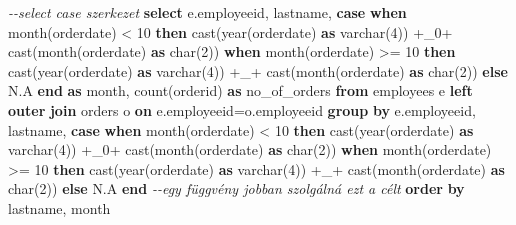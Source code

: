 \documentclass[
  magyar,
]{article}
\newenvironment{Shaded}{}{}
\newcommand{\CommentTok}[1]{\textcolor[rgb]{0.38,0.63,0.69}{\textit{#1}}}
\newcommand{\ControlFlowTok}[1]{\textcolor[rgb]{0.00,0.44,0.13}{\textbf{#1}}}
\newcommand{\DataTypeTok}[1]{\textcolor[rgb]{0.56,0.13,0.00}{#1}}
\newcommand{\DecValTok}[1]{\textcolor[rgb]{0.25,0.63,0.44}{#1}}
\newcommand{\FunctionTok}[1]{\textcolor[rgb]{0.02,0.16,0.49}{#1}}
\newcommand{\KeywordTok}[1]{\textcolor[rgb]{0.00,0.44,0.13}{\textbf{#1}}}
\newcommand{\NormalTok}[1]{#1}
\newcommand{\OperatorTok}[1]{\textcolor[rgb]{0.40,0.40,0.40}{#1}}
\newcommand{\StringTok}[1]{\textcolor[rgb]{0.25,0.44,0.63}{#1}}
\begin{document}
\begin{Shaded}
\begin{Highlighting}[]
\CommentTok{{-}{-}select case szerkezet}
\KeywordTok{select}\NormalTok{ e.employeeid, lastname,}
\ControlFlowTok{case}
  \ControlFlowTok{when} \DataTypeTok{month}\NormalTok{(orderdate) }\OperatorTok{\textless{}} \DecValTok{10} \ControlFlowTok{then} \FunctionTok{cast}\NormalTok{(}\DataTypeTok{year}\NormalTok{(orderdate) }\KeywordTok{as} \DataTypeTok{varchar}\NormalTok{(}\DecValTok{4}\NormalTok{)) }\OperatorTok{+}\StringTok{\textquotesingle{}\_0\textquotesingle{}}\OperatorTok{+}
    \FunctionTok{cast}\NormalTok{(}\DataTypeTok{month}\NormalTok{(orderdate) }\KeywordTok{as} \DataTypeTok{char}\NormalTok{(}\DecValTok{2}\NormalTok{))}
  \ControlFlowTok{when} \DataTypeTok{month}\NormalTok{(orderdate) }\OperatorTok{\textgreater{}=} \DecValTok{10} \ControlFlowTok{then} \FunctionTok{cast}\NormalTok{(}\DataTypeTok{year}\NormalTok{(orderdate) }\KeywordTok{as} \DataTypeTok{varchar}\NormalTok{(}\DecValTok{4}\NormalTok{)) }\OperatorTok{+}\StringTok{\textquotesingle{}\_\textquotesingle{}}\OperatorTok{+}
    \FunctionTok{cast}\NormalTok{(}\DataTypeTok{month}\NormalTok{(orderdate) }\KeywordTok{as} \DataTypeTok{char}\NormalTok{(}\DecValTok{2}\NormalTok{))}
  \ControlFlowTok{else} \StringTok{\textquotesingle{}N.A\textquotesingle{}}
\ControlFlowTok{end} \KeywordTok{as} \DataTypeTok{month}\NormalTok{,}
\FunctionTok{count}\NormalTok{(orderid) }\KeywordTok{as}\NormalTok{ no\_of\_orders}
\KeywordTok{from}\NormalTok{ employees e }\KeywordTok{left} \KeywordTok{outer} \KeywordTok{join}\NormalTok{ orders o }\KeywordTok{on}\NormalTok{ e.employeeid}\OperatorTok{=}\NormalTok{o.employeeid}
\KeywordTok{group} \KeywordTok{by}\NormalTok{ e.employeeid, lastname,}
\ControlFlowTok{case}
  \ControlFlowTok{when} \DataTypeTok{month}\NormalTok{(orderdate) }\OperatorTok{\textless{}} \DecValTok{10} \ControlFlowTok{then} \FunctionTok{cast}\NormalTok{(}\DataTypeTok{year}\NormalTok{(orderdate) }\KeywordTok{as} \DataTypeTok{varchar}\NormalTok{(}\DecValTok{4}\NormalTok{)) }\OperatorTok{+}\StringTok{\textquotesingle{}\_0\textquotesingle{}}\OperatorTok{+}
    \FunctionTok{cast}\NormalTok{(}\DataTypeTok{month}\NormalTok{(orderdate) }\KeywordTok{as} \DataTypeTok{char}\NormalTok{(}\DecValTok{2}\NormalTok{))}
  \ControlFlowTok{when} \DataTypeTok{month}\NormalTok{(orderdate) }\OperatorTok{\textgreater{}=} \DecValTok{10} \ControlFlowTok{then} \FunctionTok{cast}\NormalTok{(}\DataTypeTok{year}\NormalTok{(orderdate) }\KeywordTok{as} \DataTypeTok{varchar}\NormalTok{(}\DecValTok{4}\NormalTok{)) }\OperatorTok{+}\StringTok{\textquotesingle{}\_\textquotesingle{}}\OperatorTok{+}
    \FunctionTok{cast}\NormalTok{(}\DataTypeTok{month}\NormalTok{(orderdate) }\KeywordTok{as} \DataTypeTok{char}\NormalTok{(}\DecValTok{2}\NormalTok{))}
  \ControlFlowTok{else} \StringTok{\textquotesingle{}N.A\textquotesingle{}}
\ControlFlowTok{end} \CommentTok{{-}{-}egy függvény jobban szolgálná ezt a célt}
\KeywordTok{order} \KeywordTok{by}\NormalTok{ lastname, }\DataTypeTok{month}
\end{Highlighting}
\end{Shaded}
\end{document}
